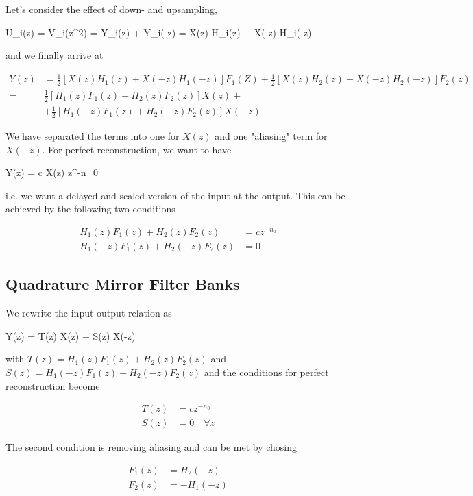 Let's consider the effect of down- and upsampling,

\bee
U_i(z) = V_i(z^2) =  Y_i(z) +  Y_i(-z) =  X(z) H_i(z) +  X(-z) H_i(-z)
\eee

and we finally arrive at

\begin{align*}
Y(z) &= \frac{1}{2} \left[  X(z) H_1(z) + X(-z) H_1(-z) \right]  F_1(Z) + \frac{1}{2} \left[ X(z) H_2(z) +  X(-z) H_2(-z) \right] F_2(z) \\
= &\frac{1}{2} \left[ H_1(z) F_1(z) + H_2(z) F_2(z) \right] X(z) + \\
&+ \frac{1}{2} \left[ H_1(-z) F_1(z) + H_2(-z) F_2(z) \right] X(-z)
\end{align*}

We have separated the terms into one for $X(z)$ and one "aliasing" term for $X(-z)$. For perfect reconstruction, we want to have

\bee
Y(z) = c X(z) z^{-n_0}
\eee

i.e. we want a delayed and scaled version of the input at the output. This can be achieved by the following two conditions

\begin{align*}
H_1(z) F_1(z) + H_2(z) F_2(z) &= c z^{-n_0} \\
H_1(-z) F_1(z) + H_2(-z) F_2(z) &= 0
\end{align*}


\subsection*{Quadrature Mirror Filter Banks}

We rewrite the input-output relation as

\bee
Y(z) = T(z) X(z) + S(z) X(-z)
\eee

with $T(z) = H_1(z) F_1(z) + H_2(z) F_2(z)$ and $S(z) = H_1(-z) F_1(z) + H_2(-z) F_2(z)$ and the conditions for perfect reconstruction become

\begin{align*}
  T(z) &= c z^{-n_0} \\
  S(z) &= 0 \quad \forall z
\end{align*}

The second condition is removing aliasing and can be met by chosing

\begin{align}\label{2021-21-09:eq1}
  F_1(z) &= H_2(-z) \\
  F_2(z) &= -H_1(-z)
\end{align}

